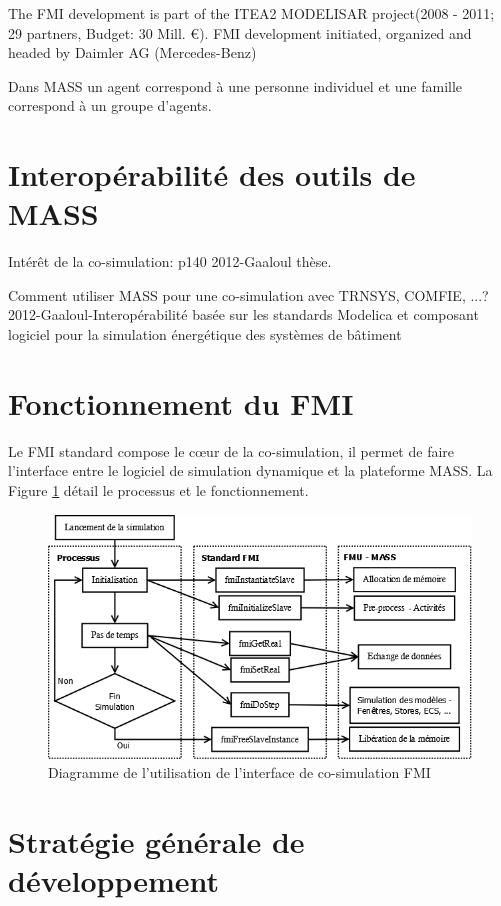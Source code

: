 The FMI development is part of the ITEA2 MODELISAR project(2008 - 2011; 29 partners, Budget: 30 Mill. \euro). FMI development initiated, organized and headed by Daimler AG (Mercedes-Benz)

Dans MASS un agent correspond à une personne individuel et une famille correspond à un groupe d'agents.

\section{Interopérabilité des outils de MASS}

Intérêt de la co-simulation: p140 2012-Gaaloul thèse.

Comment utiliser MASS pour une co-simulation avec TRNSYS, COMFIE, ...? 2012-Gaaloul-Interopérabilité basée sur les standards Modelica et composant logiciel pour la simulation énergétique des systèmes de bâtiment

\section{Fonctionnement du FMI}

Le FMI standard compose le cœur de la co-simulation, il permet de faire l'interface entre le logiciel de simulation dynamique et la plateforme MASS. La Figure \ref{fig:diagramOfTheCo-Simulation} détail le processus et le fonctionnement.

\begin{figure}[H]
\centering
\includegraphics[scale=0.45]{Images/diagramOfTheCo-Simulation}
\caption{Diagramme de l'utilisation de l'interface de co-simulation FMI}
\label{fig:diagramOfTheCo-Simulation}
\end{figure}

\section{Stratégie générale de développement}



